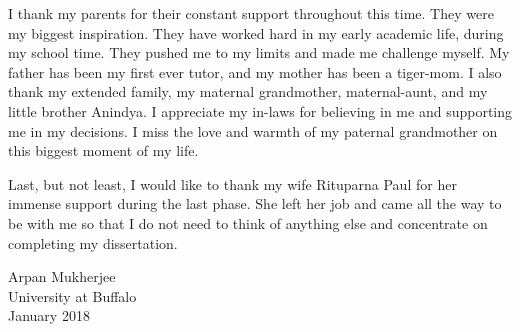 I thank my parents for their constant support throughout this time. They were my biggest inspiration. They have worked hard in my early academic life, during my school time. They pushed me to my limits and made me challenge myself. My father has been my first ever tutor, and my mother has been a tiger-mom. I also thank my extended family, my maternal grandmother, maternal-aunt, and my little brother Anindya. I appreciate my in-laws for believing in me and supporting me in my decisions. I miss the love and warmth of my paternal grandmother on this biggest moment of my life.

Last, but not least, I would like to thank my wife Rituparna Paul for her immense support during the last phase. She left her job and came all the way to be with me so that I do not need to think of anything else and concentrate on completing my dissertation. 

\vskip2cm
\begin{flushleft}
Arpan Mukherjee \\
University at Buffalo \\
January 2018
\end{flushleft}

